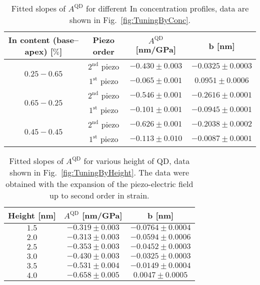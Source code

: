 		\begin{table}[ht!]
 			\centering
 			\caption{Fitted slopes of $A^{\mathrm{QD}}$ for different In concentration profiles, data are shown in Fig.~\ref{fig:TuningByConc}.}
 				\label{tab:conc_slopes}
 				\begin{tabular}{|c|c|c|c|}
 					\hline
 		In content (base--apex)	[$\%$]	& Piezo order	& $A^{\mathrm{QD}}$ [nm/GPa]    & b   [nm]    \\ \hline
 					\multirow{2}{*}{$0.25-0.65$} & $2^\mathrm{nd}$ piezo &$-0.430 \pm 0.003$  & $-0.0325 \pm 0.0003$      \\ \cline{2-4}
 			&	$1^\mathrm{st}$ piezo 	& $-0.065 \pm 0.001$  & $0.0951 \pm 0.0006$      \\ \hline
 			\multirow{2}{*}{$0.65-0.25$} & $2^\mathrm{nd}$ piezo &$-0.546 \pm 0.001$  & $-0.2616 \pm 0.0001$      \\ \cline{2-4}
 			&	$1^\mathrm{st}$ piezo 	& $-0.101 \pm 0.001$  & $-0.0945 \pm 0.0001$      \\ \hline
 			\multirow{2}{*}{$0.45-0.45$} & $2^\mathrm{nd}$ piezo &$-0.626 \pm 0.001$  & $-0.2038 \pm 0.0002$      \\ \cline{2-4}
 			&	$1^\mathrm{st}$ piezo 	& $-0.113 \pm 0.010$  & $-0.0087 \pm 0.0001 $     \\ \hline
 				\end{tabular}    
 			\end{table}
 			

 		\begin{table}[ht!]
 			\centering
 			\caption{Fitted slopes of $A^{\mathrm{QD}}$ for various height of QD, data shown in Fig.~\ref{fig:TuningByHeight}. The data were obtained with the expansion of the piezo-electric field up to second order in strain.}
 			\label{tab:height_slopes}
 			\begin{tabular}{|c|c|c|}
 				\hline
 				Height [nm]		& $A^{\mathrm{QD}}$ [nm/GPa]    & b   [nm]    \\ \hline
 			 $1.5$  &$-0.319 \pm 0.003$  & $-0.0764 \pm 0.0004$     \\ \hline
 			$2.0$	&$-0.313 \pm 0.003$  & $-0.0594 \pm 0.0006$      \\ \hline
 			 $2.5$  &$-0.353 \pm 0.003$  & $-0.0452\pm 0.0003$     \\ \hline
 			 $3.0$	&$-0.430 \pm 0.003$  & $-0.0325 \pm 0.0003$      \\ \hline
 			 $3.5$  &$-0.531 \pm 0.004$  & $-0.0149\pm 0.0004$     \\ \hline
 			 $4.0$	&$-0.658 \pm 0.005$  & $0.0047 \pm 0.0005$      \\ \hline
 			\end{tabular}    
 		\end{table}
 		

